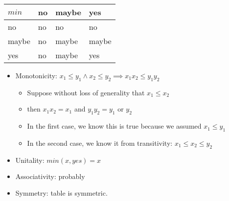 \begin{minipage}{0.48\textwidth}

    \centering
    \begin{tabular}{|l|l|l|l|}
      \hline

      $min$ & no & maybe & yes   \\ \hline
      no    & no & no    & no    \\ \hline
      maybe & no & maybe & maybe \\ \hline
      yes   & no & maybe & yes   \\ \hline
    \end{tabular}
  \end{minipage}

  \begin{itemize}
    \item Monotonicity: $x_1 \leq y_1 \land x_2 \leq y_2 \implies x_1x_2 \leq y_1y_2$
          \begin{itemize}
            \item  Suppose without loss of generality that $x_1\leq x_2$
            \item then $x_1x_2=x_1$ and $y_1y_2 = y_1$ or $y_2$
            \item In the first case, we know this is true because we assumed $x_1 \leq y_1$
            \item In the second case, we know it from transitivity: $x_1 \leq x_2\leq y_2$
          \end{itemize}
    \item Unitality: $min(x,yes)=x$
    \item Associativity: probably
    \item Symmetry: table is symmetric.

  \end{itemize}